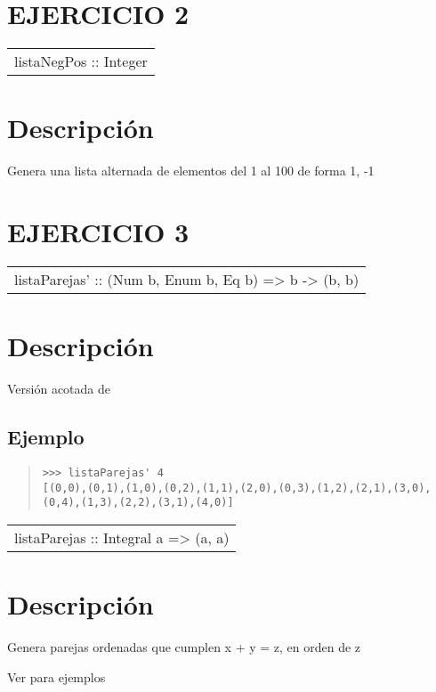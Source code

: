 \section{EJERCICIO 2}
\begin{haddockdesc}
\item[\begin{tabular}{@{}l}
listaNegPos :: {\char 91}Integer{\char 93}
\end{tabular}]
{\haddockbegindoc
\section*{Descripción}
Genera una lista alternada de elementos del 1 al 100 de forma {}1, -1{}\par}
\end{haddockdesc}
\section{EJERCICIO 3}
\begin{haddockdesc}
\item[\begin{tabular}{@{}l}
listaParejas' :: (Num b, Enum b, Eq b) => b -> {\char 91}(b, b){\char 93}
\end{tabular}]
{\haddockbegindoc
\section*{Descripción}
Versión acotada de \par
\subsection*{Ejemplo}
\begin{quote}
{\haddockverb\begin{verbatim}
>>> listaParejas' 4
[(0,0),(0,1),(1,0),(0,2),(1,1),(2,0),(0,3),(1,2),(2,1),(3,0),(0,4),(1,3),(2,2),(3,1),(4,0)]

\end{verbatim}}
\end{quote}}
\end{haddockdesc}
\begin{haddockdesc}
\item[\begin{tabular}{@{}l}
listaParejas :: Integral a => {\char 91}(a, a){\char 93}
\end{tabular}]
{\haddockbegindoc
\section*{Descripción}
Genera parejas ordenadas que cumplen x + y = z, en orden de z\par
Ver  para ejemplos\par}
\end{haddockdesc}
